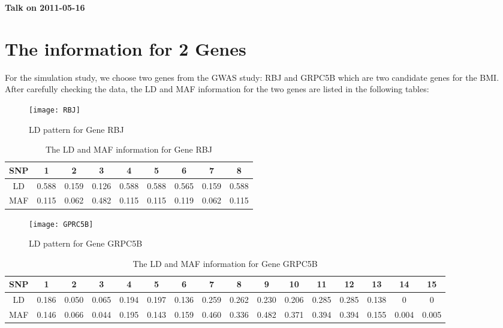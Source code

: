 \documentclass{article}
\begin{document}
    \begin{center}

        {\Large \bf Talk on 2011-05-16}
    \end{center}

    \section{The information for 2 Genes}
    For the simulation study, we choose two genes from the GWAS study: RBJ and GRPC5B which are two candidate genes for the BMI. After carefully checking the data, the LD and MAF information for the two genes are listed in the following tables:\\
    
    \begin{figure}[htbp]
        \centering
        \texttt{[image: RBJ]}
        \caption{LD pattern for Gene RBJ}
    \end{figure}

    \begin{table}[htbp]
        \centering
        \caption{The LD and MAF information for Gene RBJ}
        \begin{tabular}{c|cccccccc}
            \hline
            SNP & 1&	2&	3&	4&	5&	6&	7&	8\\
            \hline
            LD &0.588 &	0.159& 	0.126 &	0.588 &	0.588 &	0.565 &	0.159 &	0.588\\
            MAF &0.115 &	0.062 &	0.482 &	0.115 &	0.115 &	0.119 	&0.062& 	0.115\\
            \hline
        \end{tabular}
    \end{table}
    
    \begin{figure}[htbp]
        \centering
        \texttt{[image: GPRC5B]}
        \caption{LD pattern for Gene GRPC5B}
    \end{figure}

    \begin{table}[htbp]
        \centering
        \caption{The LD and MAF information for Gene GRPC5B}
        \begin{tabular}{c|ccccccccccccccc}
            \hline
            SNP &1	&2	&3	&4	&5	&6	&7	&8	&9	&10	&11	&12	&13	&14	&15\\
            \hline
            LD  &0.186 &0.050 	&0.065 	&0.194 	&0.197 	&0.136 	&0.259 	&0.262 	&0.230 	&0.206 	&0.285 	&0.285 	&0.138 	&0 	&0\\
            MAF &0.146 &0.066 	&0.044 	&0.195 	&0.143 	&0.159 	&0.460 	&0.336 	&0.482 	&0.371 	&0.394 	&0.394 	&0.155 	&0.004 	&0.005\\
            \hline
        \end{tabular}
    \end{table}
\end{document}
